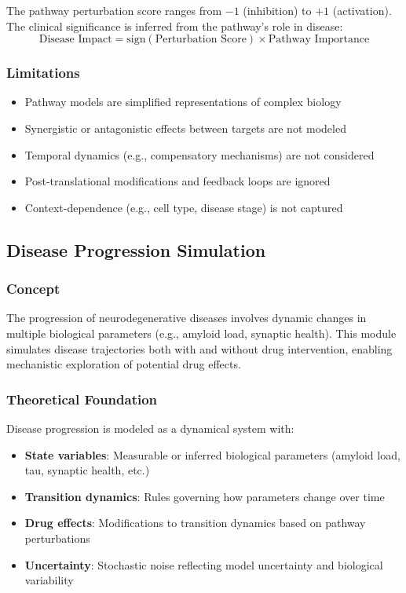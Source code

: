 \documentclass[12pt,a4paper]{article}
\begin{document}
The pathway perturbation score ranges from $-1$ (inhibition) to $+1$ (activation). The clinical significance is inferred from the pathway's role in disease:
\[
\text{Disease Impact} = \text{sign}(\text{Perturbation Score}) \times \text{Pathway Importance}
\]

\subsubsection{Limitations}
\begin{itemize}
  \item Pathway models are simplified representations of complex biology
  \item Synergistic or antagonistic effects between targets are not modeled
  \item Temporal dynamics (e.g., compensatory mechanisms) are not considered
  \item Post-translational modifications and feedback loops are ignored
  \item Context-dependence (e.g., cell type, disease stage) is not captured
\end{itemize}

\subsection{Disease Progression Simulation}
\label{subsec:simulation}

\subsubsection{Concept}
The progression of neurodegenerative diseases involves dynamic changes in multiple biological parameters (e.g., amyloid load, synaptic health). This module simulates disease trajectories both with and without drug intervention, enabling mechanistic exploration of potential drug effects.

\subsubsection{Theoretical Foundation}
Disease progression is modeled as a dynamical system with:
\begin{itemize}
  \item \textbf{State variables}: Measurable or inferred biological parameters (amyloid load, tau, synaptic health, etc.)
  \item \textbf{Transition dynamics}: Rules governing how parameters change over time
  \item \textbf{Drug effects}: Modifications to transition dynamics based on pathway perturbations
  \item \textbf{Uncertainty}: Stochastic noise reflecting model uncertainty and biological variability
\end{itemize}
\end{document}
